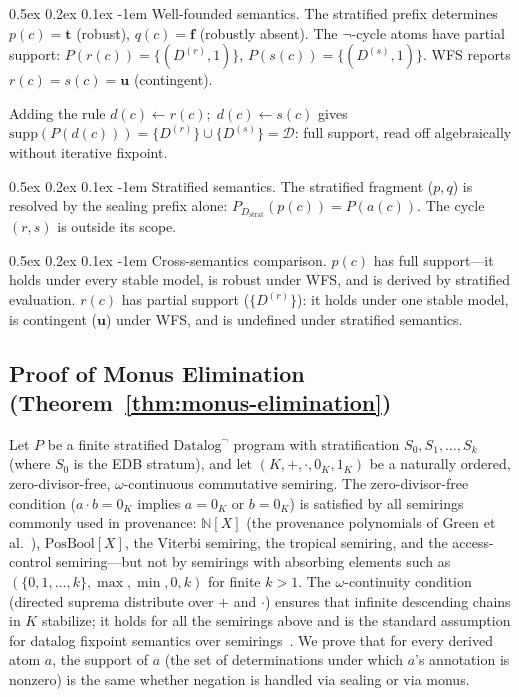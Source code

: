 \documentclass[acmsmall,review,anonymous]{acmart}
\makeatletter
\renewcommand{\paragraph}{\@startsection{paragraph}{4}{\z@}%
  {0.5ex \@plus 0.2ex \@minus 0.1ex}%
  {-1em}%
  {\normalfont\normalsize\bfseries}}
\theoremstyle{remark}
\numberwithin{definition}{section}
\numberwithin{theorem}{section}
\numberwithin{lemma}{section}
\numberwithin{corollary}{section}
\numberwithin{remark}{section}
\numberwithin{example}{section}
\numberwithin{observation}{section}
\numberwithin{assumption}{section}
\makeatother
\begin{document}
\paragraph{Well-founded semantics.}
The stratified prefix determines $p(c) = \mathbf{t}$ (robust),
$q(c) = \mathbf{f}$ (robustly absent).
The $\neg$-cycle atoms have partial support:
$P(r(c)) = \{(D^{(r)}, 1)\}$, $P(s(c)) = \{(D^{(s)}, 1)\}$.
WFS reports $r(c) = s(c) = \mathbf{u}$ (contingent).

Adding the rule $d(c) \leftarrow r(c);\; d(c) \leftarrow s(c)$ gives
$\mathrm{supp}(P(d(c))) = \{D^{(r)}\} \cup \{D^{(s)}\} = \mathcal{D}$:
full support, read off algebraically without iterative fixpoint.

\paragraph{Stratified semantics.}
The stratified fragment ($p, q$) is resolved by the sealing prefix
alone: $P_{D_{\mathrm{strat}}}(p(c)) = P(a(c))$.
The cycle $(r, s)$ is outside its scope.

\paragraph{Cross-semantics comparison.}
$p(c)$ has full support---it holds under every stable model, is robust
under WFS, and is derived by stratified evaluation.
$r(c)$ has partial support ($\{D^{(r)}\}$): it holds under one stable
model, is contingent ($\mathbf{u}$) under WFS, and is undefined under
stratified semantics.

\subsection{Proof of Monus Elimination (Theorem~\ref{thm:monus-elimination})}

Let $P$ be a finite stratified $\mbox{Datalog}^\neg$ program with
stratification $S_0, S_1, \ldots, S_k$ (where $S_0$ is the EDB
stratum), and let $(K, +, \cdot, 0_K, 1_K)$ be a naturally ordered,
zero-divisor-free, $\omega$-continuous commutative semiring.
The zero-divisor-free condition ($a \cdot b = 0_K$ implies $a = 0_K$
or $b = 0_K$) is satisfied by all semirings commonly used in
provenance: $\mathbb{N}[X]$ (the provenance polynomials of Green et
al.~\cite{green2007provenance}), $\mathrm{PosBool}[X]$, the Viterbi
semiring, the tropical semiring, and the access-control
semiring---but not by semirings with absorbing elements such as
$(\{0,1,\ldots,k\}, \max, \min, 0, k)$ for finite $k > 1$.
The $\omega$-continuity condition (directed suprema distribute over
$+$ and $\cdot$) ensures that infinite descending chains in $K$
stabilize; it holds for all the semirings above and is the standard
assumption for datalog fixpoint semantics over
semirings~\cite{green2007provenance,dannert2021semiring}.
We prove that for every derived atom $a$, the support of $a$
(the set of determinations under which $a$'s annotation is nonzero)
is the same whether negation is handled via sealing or via monus.
\end{document}
